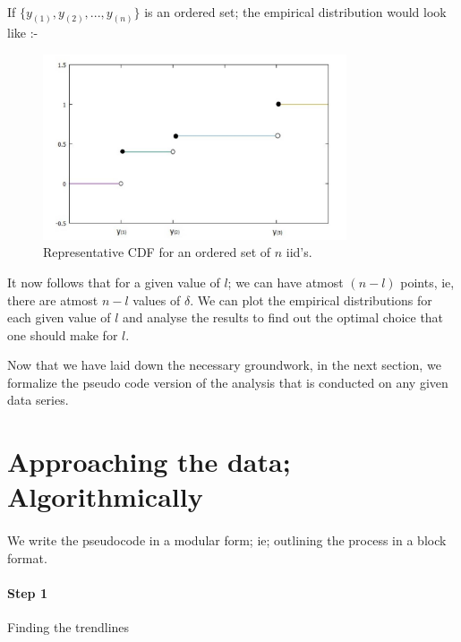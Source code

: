 \documentclass[letterpaper, 12pt] {article}
\begin{document}
	\paragraph{}
	If $\{y_{(1)}, y_{(2)}, ..., y_{(n)}\}$ is an ordered set; the empirical distribution would look like :-

	\begin{figure}[h!]
		\centering
		\includegraphics[width=0.8\textwidth]{empirical_cdf_representative}
		\caption{Representative CDF for an ordered set of $n$ iid's.}
		\label{Figure 4}
	\end{figure}
	
	It now follows that for a given value of $l$; we can have atmost $(n-l)$ points, ie, there are atmost ${n-l}$ values of $\delta$.  We can plot the empirical distributions for each given value of $l$ and analyse the results to find out the optimal choice that one should make for $l$. 
	
	\pagebreak
	
	
	
	Now that we have laid down the necessary groundwork, in the next section, we formalize the pseudo code version of the analysis that is conducted on any given data series. 
	
	\section{Approaching the data; Algorithmically}
	\paragraph{}
	We write the pseudocode in a modular form; ie; outlining the process in a block format.
	
	\paragraph[Finding the trendline]{Step 1} Finding the trendlines 
	
\end{document}
